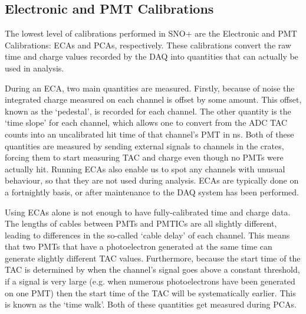 \subsection{Electronic and PMT Calibrations}
The lowest level of calibrations performed in SNO+ are the Electronic and PMT Calibrations: ECAs and PCAs, respectively. These calibrations convert the raw time and charge values recorded by the DAQ into quantities that can actually be used in analysis.

During an ECA, two main quantities are measured. Firstly, because of noise the integrated charge measured on each channel is offset by some amount. This offset, known as the `pedestal', is recorded for each channel. The other quantity is the `time slope' for each channel, which allows one to convert from the ADC TAC counts into an uncalibrated hit time of that channel's PMT in \si{\ns}. Both of these quantities are measured by sending external signals to channels in the crates, forcing them to start measuring TAC and charge even though no PMTs were actually hit. Running ECAs also enable us to spot any channels with unusual behaviour, so that they are not used during analysis. ECAs are typically done on a fortnightly basis, or after maintenance to the DAQ system has been performed.

Using ECAs alone is not enough to have fully-calibrated time and charge data. The lengths of cables between PMTs and PMTICs are all slightly different, leading to differences in the so-called `cable delay' of each channel. This means that two PMTs that have a photoelectron generated at the same time can generate slightly different TAC values. Furthermore, because the start time of the TAC is determined by when the channel's signal goes above a constant threshold, if a signal is very large (e.g. when numerous photoelectrons have been generated on one PMT) then the start time of the TAC will be systematically earlier. This is known as the `time walk'. Both of these quantities get measured during PCAs.

